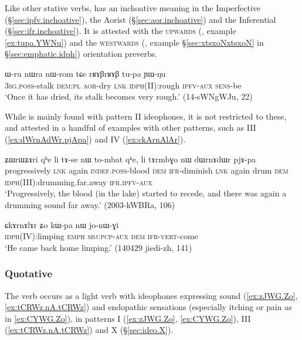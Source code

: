
Like other stative verbs,  has an inchoative meaning in the Imperfective (§\ref{sec:ipfv.inchoative}), the Aorist (§\ref{sec:aor.inchoative}) and the Inferential (§\ref{sec:ifr.inchoative}). It is attested with the \textsc{upwards} (, example \ref{ex:tupa.YWNu}) and the \textsc{westwards} (, example §\ref{sec:xtsxoNxtsxoN} in §\ref{sec:emphatic.idph}) orientation preverbs.


\begin{exe}
\ex \label{ex:tupa.YWNu}
\gll ɯ-ru nɯra nɯ-rom tɕe rʁɤβrʁɤβ tu-pa ɲɯ-ŋu  \\
\textsc{3sg}.\textsc{poss}-stalk \textsc{dem}:\textsc{pl} \textsc{aor}-dry \textsc{lnk} \textsc{idph}(II):rough \textsc{ipfv}-\textsc{aux} \textsc{sens}-be \\
\glt `Once it has dried, its stalk becomes very rough.' (14-sWNgWJu, 22)
\end{exe}

While  is mainly found with pattern II ideophones, it is not restricted to these, and attested in a handful of examples with other patterns, such as III (\ref{ex:dWrnAdWr.pjApa}) and IV (\ref{ex:ckArnAlAr}).

\begin{exe}
\ex \label{ex:dWrnAdWr.pjApa}
\gll ʑɯrɯʑɤri qʰe li tɤ-se nɯ to-mbat qʰe, li tɤrmbɣo nɯ dɯrnɤdɯr pjɤ-pa \\
progressively \textsc{lnk} again \textsc{indef}.\textsc{poss}-blood \textsc{dem} \textsc{ifr}-diminish \textsc{lnk} again drum \textsc{dem} \textsc{idph}(III):drumming.far.away \textsc{ifr}.\textsc{ipfv}-\textsc{aux} \\
\glt `Progressively, the blood (in the lake) started to recede, and there was again a drumming sound far away.' (2003-kWBRa, 106)
\end{exe}


\begin{exe}
\ex \label{ex:ckArnAlAr}
\gll ɕkɤrnɤlɤr ʑo kɯ-pa nɯ jo-nɯ-ɣi \\
\textsc{idph}(IV):limping \textsc{emph} \textsc{sbj}:\textsc{pcp}-\textsc{aux} \textsc{dem} \textsc{ifr}-\textsc{vert}-come \\
\glt `He came back home limping.' (140429 jiedi-zh, 141)
\end{exe}

\subsubsection{Quotative }\label{sec:idph.ti}
The verb  occurs as a light verb with ideophones expressing sound (\ref{ex:zJWG.Zo}, \ref{ex:tCRWz.nA.tCRWz}) and endopathic sensations (especially itching or pain as in \ref{ex:CYWG.Zo}), in patterns I (\ref{ex:zJWG.Zo}, \ref{ex:CYWG.Zo}), III (\ref{ex:tCRWz.nA.tCRWz}) and X (§\ref{sec:ideo.X}).

